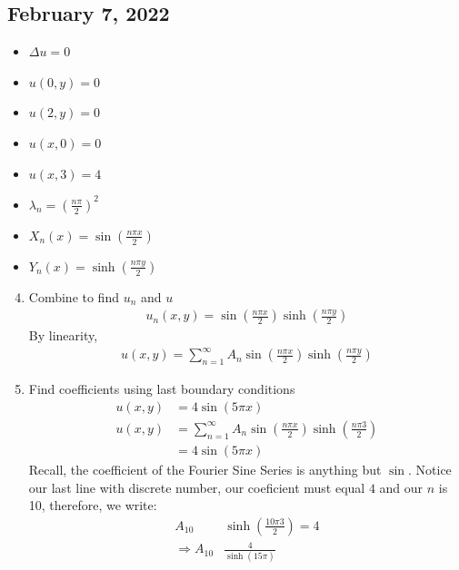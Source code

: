 \documentclass{article}
\begin{document}
\subsection*{February 7, 2022}
\begin{itemize}
  \item $\Delta u = 0$
  \item $u(0, y) = 0$
  \item $u(2, y) = 0$
  \item $u(x, 0) = 0$
  \item $u(x, 3) = 4$
  \item $\lambda_n = \left(\frac{n \pi}{2}\right)^2$
  \item $X_n(x) = \sin\left(\frac{n \pi x}{2}\right)$
  \item $Y_n(x) = \sinh\left(\frac{n \pi y}{2}\right)$
\end{itemize}
\begin{enumerate}
  \setcounter{enumi}{3}
  \item Combine to find $u_n$ and $u$
  \begin{align}
    u_n(x, y) = \sin\left( \frac{n \pi x}{2} \right)\sinh\left(\frac{n\pi y}{2} \right)
  \end{align}
  By linearity,
  \begin{align}
    u(x, y) = \sum^\infty_{n = 1} A_n \sin\left( \frac{n \pi x}{2} \right) \sinh\left( \frac{n \pi y}{2} \right)
  \end{align}
  \item Find coefficients using last boundary conditions
  \begin{align}
    u(x, y) & = 4 \sin(5 \pi x)\\
    u(x, y) & = \sum^\infty_{n = 1} A_n \sin\left(\frac{n \pi x}{2} \right) \sinh\left(\frac{n \pi 3}{2} \right)\\
    & = 4\sin(5 \pi x)
  \end{align}
  Recall, the coefficient of the Fourier Sine Series is anything but $\sin$. Notice our last line with discrete number, our coeficient must equal $4$ and our $n$ is 10, therefore, we write:
  \begin{align}
    A_{10} & \sinh\left( \frac{10 \pi 3}{2} \right) = 4\\
    \Rightarrow A_10 & \frac{4}{\sinh(15 \pi)}
  \end{align}
\end{enumerate}
\end{document}
